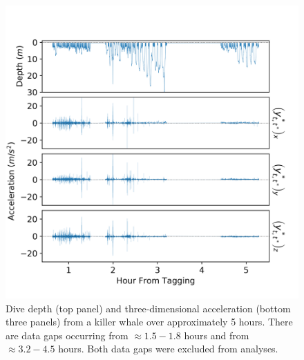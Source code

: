 
\begin{figure}[ht]
	\centering
	\includegraphics[width=5.25in]{../Plots/raw_data.png}
	\caption{Dive depth (top panel) and three-dimensional acceleration (bottom three panels) from a killer whale over approximately 5 hours. There are data gaps occurring from $\approx 1.5-1.8$ hours and from $\approx 3.2-4.5$ hours. Both data gaps were excluded from analyses.}
	\label{fig:data}
\end{figure}

